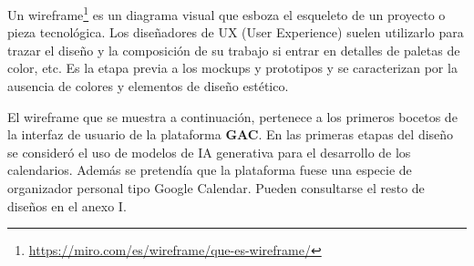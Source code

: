 Un wireframe\footnote{\url{https://miro.com/es/wireframe/que-es-wireframe/}} es un diagrama visual que esboza el esqueleto de un proyecto o pieza tecnológica. Los diseñadores de UX (User Experience) suelen utilizarlo para trazar el diseño y la composición de su trabajo si entrar en detalles de paletas de color, etc. Es la etapa previa a los mockups y prototipos y se caracterizan por la ausencia de colores y elementos de diseño estético.\newline

El wireframe que se muestra a continuación, pertenece a los primeros bocetos de la interfaz de usuario de la plataforma \textbf{GAC}. En las primeras etapas del diseño se consideró el uso de modelos de IA generativa para el desarrollo de los calendarios. Además se pretendía que la plataforma fuese una especie de organizador personal tipo Google Calendar. Pueden consultarse el resto de diseños en el anexo I.\newline


